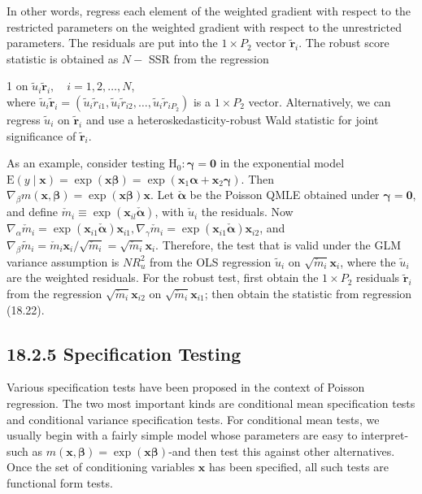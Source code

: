 \documentclass[10pt]{article}
\begin{document}
In other words, regress each element of the weighted gradient with respect to the restricted parameters on the weighted gradient with respect to the unrestricted parameters. The residuals are put into the $1 \times P_{2}$ vector $\tilde{\mathbf{r}}_{i}$. The robust score statistic is obtained as $N-$ SSR from the regression

1 on $\tilde{u}_{i} \tilde{\mathbf{r}}_{i}, \quad i=1,2, \ldots, N$,\\
where $\tilde{u}_{i} \tilde{\mathbf{r}}_{i}=\left(\tilde{u}_{i} \tilde{r}_{i 1}, \tilde{u}_{i} \tilde{r}_{i 2}, \ldots, \tilde{u}_{i} \tilde{r}_{i P_{2}}\right)$ is a $1 \times P_{2}$ vector. Alternatively, we can regress $\tilde{u}_{i}$ on $\tilde{\mathbf{r}}_{i}$ and use a heteroskedasticity-robust Wald statistic for joint significance of $\tilde{\mathbf{r}}_{i}$.

As an example, consider testing $\mathrm{H}_{0}: \boldsymbol{\gamma}=\mathbf{0}$ in the exponential model $\mathrm{E}(y \mid \mathbf{x})= \exp (\mathbf{x} \boldsymbol{\beta})=\exp \left(\mathbf{x}_{1} \boldsymbol{\alpha}+\mathbf{x}_{2} \boldsymbol{\gamma}\right)$. Then $\nabla_{\beta} m(\mathbf{x}, \boldsymbol{\beta})=\exp (\mathbf{x} \boldsymbol{\beta}) \mathbf{x}$. Let $\check{\boldsymbol{\alpha}}$ be the Poisson QMLE obtained under $\boldsymbol{\gamma}=\mathbf{0}$, and define $\check{m}_{i} \equiv \exp \left(\mathbf{x}_{i l} \check{\boldsymbol{\alpha}}\right)$, with $\check{u}_{i}$ the residuals. Now $\nabla_{\alpha} \check{m}_{i}= \exp \left(\mathbf{x}_{i 1} \check{\boldsymbol{\alpha}}\right) \mathbf{x}_{i 1}, \nabla_{\gamma} \check{m}_{i}=\exp \left(\mathbf{x}_{i 1} \check{\boldsymbol{\alpha}}\right) \mathbf{x}_{i 2}$, and $\nabla_{\beta} \tilde{m}_{i}=\check{m}_{i} \mathbf{x}_{i} / \sqrt{\check{m}_{i}}=\sqrt{\check{m}_{i}} \mathbf{x}_{i}$. Therefore, the test that is valid under the GLM variance assumption is $N R_{u}^{2}$ from the OLS regression $\tilde{u}_{i}$ on $\sqrt{\check{m}_{i}} \mathbf{x}_{i}$, where the $\tilde{u}_{i}$ are the weighted residuals. For the robust test, first obtain the $1 \times P_{2}$ residuals $\tilde{\mathbf{r}}_{i}$ from the regression $\sqrt{\check{m}_{i}} \mathbf{x}_{i 2}$ on $\sqrt{\check{m}_{i}} \mathbf{x}_{i 1}$; then obtain the statistic from regression (18.22).

\subsection*{18.2.5 Specification Testing}
Various specification tests have been proposed in the context of Poisson regression. The two most important kinds are conditional mean specification tests and conditional variance specification tests. For conditional mean tests, we usually begin with a fairly simple model whose parameters are easy to interpret-such as $m(\mathbf{x}, \boldsymbol{\beta})= \exp (\mathbf{x} \boldsymbol{\beta})$-and then test this against other alternatives. Once the set of conditioning variables $\mathbf{x}$ has been specified, all such tests are functional form tests.
\end{document}
